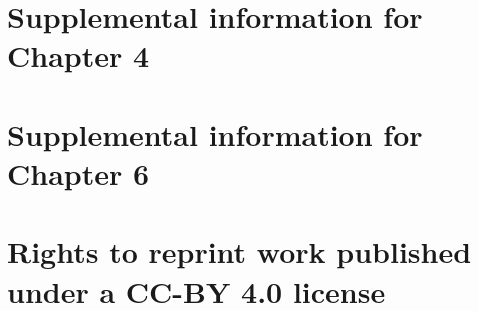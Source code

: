 \documentclass{uscthesis}
\begin{document}
\chapter{Supplemental information for Chapter 4}


\chapter{Supplemental information for Chapter 6}
       
 

\chapter{Rights to reprint work published under a CC-BY 4.0 license}

\end{document}
